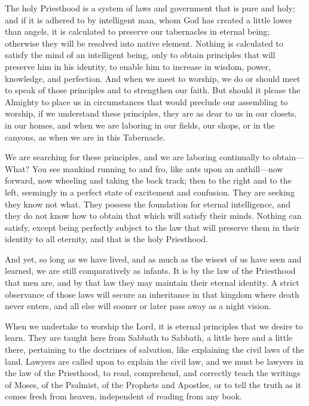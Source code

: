 					The holy Priesthood is a system of laws and government that is pure and holy; and if it is adhered to by intelligent man, whom God has created a little lower than angels, it is calculated to preserve our tabernacles in eternal being; otherwise they will be resolved into native element. Nothing is calculated to satisfy the mind of an intelligent being, only to obtain principles that will preserve him in his identity, to enable him to increase in wisdom, power, knowledge, and perfection. And when we meet to worship, we do or should meet to speak of those principles and to strengthen our faith. But should it please the Almighty to place us in circumstances that would preclude our assembling to worship, if we understand these principles, they are as dear to us in our closets, in our homes, and when we are laboring in our fields, our shops, or in the canyons, as when we are in this Tabernacle.

					We are searching for these principles, and we are laboring continually to obtain---What? You see mankind running to and fro, like ants upon an anthill---now forward, now wheeling and taking the back track; then to the right and to the left, seemingly in a perfect state of excitement and confusion. They are seeking they know not what. They possess the foundation for eternal intelligence, and they do not know how to obtain that which will satisfy their minds. Nothing can satisfy, except being perfectly subject to the law that will preserve them in their identity to all eternity, and that is the holy Priesthood.

					And yet, so long as we have lived, and as much as the wisest of us have seen and learned, we are still comparatively as infants. It is by the law of the Priesthood that men are, and by that law they may maintain their eternal identity. A strict observance of those laws will secure an inheritance in that kingdom where death never enters, and all else will sooner or later pass away as a night vision.

					When we undertake to worship the Lord, it is eternal principles that we desire to learn. They are taught here from Sabbath to Sabbath, a little here and a little there, pertaining to the doctrines of salvation, like explaining the civil laws of the land. Lawyers are called upon to explain the civil law, and we must be lawyers in the law of the Priesthood, to read, comprehend, and correctly teach the writings of Moses, of the Psalmist, of the Prophets and Apostles, or to tell the truth as it comes fresh from heaven, independent of reading from any book.

